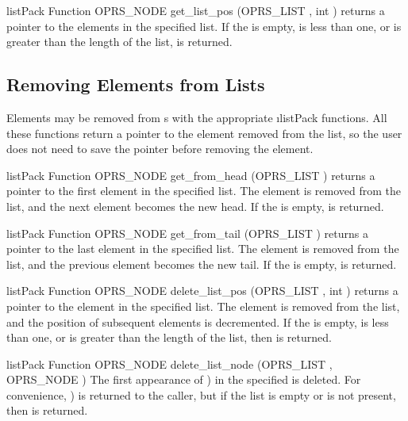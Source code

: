 \begin{typefn}{listPack Function} {OPRS\_NODE} {get\_list\_pos} {(OPRS\_LIST , int
)} returns a pointer to the 
elements in the specified list. If the  is empty,  is
less than one, or  is greater than the length of the list,
 is returned.
\end{typefn}

\subsection{Removing Elements from Lists }

Elements may be removed from s with the appropriate \i{listPack}
functions. All these functions return a pointer to the element removed
from the list, so the user does not need to save the pointer before
removing the
element.

\begin{typefn}{listPack Function} {OPRS\_NODE} {get\_from\_head} {(OPRS\_LIST )}
 returns a pointer to the first element in the
specified list. The element is removed from the list, and the next
element becomes the new head. If the  is empty, 
is returned.
\end{typefn}

\begin{typefn}{listPack Function} {OPRS\_NODE} {get\_from\_tail} {(OPRS\_LIST )}
 returns a pointer to the last element in the
specified list. The element is removed from the list, and the previous
element becomes the new tail. If the  is empty, 
is returned.
\end{typefn}

\begin{typefn}{listPack Function} {OPRS\_NODE} {delete\_list\_pos} {(OPRS\_LIST ,
int )}
 returns a pointer to the  element in
the specified list. The element is removed from the list, and the position of
subsequent elements is decremented. If the  is empty,  is
less than one, or  is greater than the length of the list, then
 is returned.
\end{typefn}

\begin{typefn}{listPack Function} {OPRS\_NODE} {delete\_list\_node} {(OPRS\_LIST ,
OPRS\_NODE )}
The first appearance of  ) in the specified
 is deleted. For convenience,  ) is
returned to the caller, but if the list is empty or  is not present, then  is returned.
\end{typefn}

